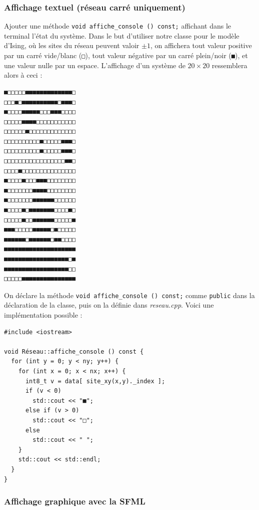\documentclass{book}
\newcommand{\inline}[1]{\texttt{#1}}
\def\filename{\emph}
\begin{document}
\subsubsection{Affichage textuel (réseau carré uniquement)}

Ajouter une méthode \inline{void affiche_console () const;} affichant dans le terminal l'état du système. Dans le but d'utiliser notre classe pour le modèle d'Ising, où les sites du réseau peuvent valoir $\pm 1$, on affichera tout valeur positive par un carré vide/blanc (\texttt{□}), tout valeur négative par un carré plein/noir (\texttt{■}), et une valeur nulle par un espace. L'affichage d'un système de $20\times 20$ ressemblera alors à ceci :

\begin{verbatim}
■□□□□□■■■■■■■■■■■■■□
□□□■□■■■■■■■■■■□■■■□
■□□□□■■■■■□□□■■■□□□□
□□□□□■■■■□□□□□□□□□□□
□□□□□□■□□□□□□□□□□□□□
□□□□□□□□□□■□□□□□■■■□
□□□□□□□□□□■□□□□□■■■□
□□□□□□□□□□□□□□□□□■■□
□□□□■□□□□□□□□□□□□□□□
■□□□□■□□□■■■□□□□□□□□
■□□□□□□□■■■■□□□□□□□□
■□□□□□□□■■■■■■□□□□□□
■□□□□■□■■■■■■■□□□□■□
□□□□□■□□■■■■■■□□□□□■
■■■□□□□□■■■■■□■□□□□□
■■■■■■□■■■■■■□■■□□□□
■■■■■■■■■■■■■■■■■■■■
■■■■■■■■■■■■■■■■■■□■
■■■■■■■■■■■■■■■■■■□□
□□□□□■■■■■■■■■■■■■■■
\end{verbatim}

\begin{correction}
On déclare la méthode \inline{void affiche_console () const;} comme \inline{public} dans la déclaration de la classe, puis on la définie dans \filename{reseau.cpp}. Voici une implémentation possible :
\begin{verbatim}
#include <iostream>

void Réseau::affiche_console () const {
  for (int y = 0; y < ny; y++) {
    for (int x = 0; x < nx; x++) {
      int8_t v = data[ site_xy(x,y)._index ];
      if (v < 0)
        std::cout << "■";
      else if (v > 0)
        std::cout << "□";
      else
        std::cout << " ";
    }
    std::cout << std::endl;
  }
}
\end{verbatim}
\end{correction}

\subsubsection{Affichage graphique avec la SFML}
\end{document}
